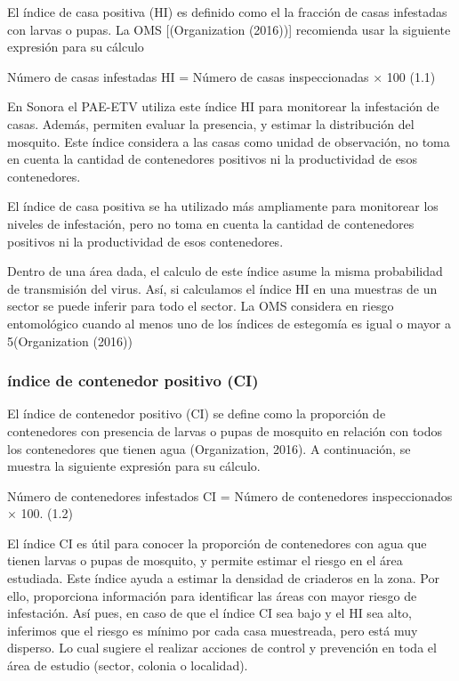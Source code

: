 \documentclass[
  letterpaper,
  twocolumn,
  landscape]{report}
\begin{document}
El índice de casa positiva (HI) es definido como el la fracción de casas
infestadas con larvas o pupas. La OMS {[}(Organization (2016)){]}
recomienda usar la siguiente expresión para su cálculo

Número de casas infestadas HI = Número de casas inspeccionadas × 100
(1.1)

En Sonora el PAE-ETV utiliza este índice HI para monitorear la
infestación de casas. Además, permiten evaluar la presencia, y estimar
la distribución del mosquito. Este índice considera a las casas como
unidad de observación, no toma en cuenta la cantidad de contenedores
positivos ni la productividad de esos contenedores.

El índice de casa positiva se ha utilizado más ampliamente para
monitorear los niveles de infestación, pero no toma en cuenta la
cantidad de contenedores positivos ni la productividad de esos
contenedores.

Dentro de una área dada, el calculo de este índice asume la misma
probabilidad de transmisión del virus. Así, si calculamos el índice HI
en una muestras de un sector se puede inferir para todo el sector. La
OMS considera en riesgo entomológico cuando al menos uno de los índices
de estegomía es igual o mayor a 5(Organization (2016))

\subsubsection{índice de contenedor positivo
(CI)}\label{uxedndice-de-contenedor-positivo-ci}

El índice de contenedor positivo (CI) se define como la proporción de
contenedores con presencia de larvas o pupas de mosquito en relación con
todos los contenedores que tienen agua (Organization, 2016). A
continuación, se muestra la siguiente expresión para su cálculo.

Número de contenedores infestados CI = Número de contenedores
inspeccionados × 100. (1.2)

El índice CI es útil para conocer la proporción de contenedores con agua
que tienen larvas o pupas de mosquito, y permite estimar el riesgo en el
área estudiada. Este índice ayuda a estimar la densidad de criaderos en
la zona. Por ello, proporciona información para identificar las áreas
con mayor riesgo de infestación. Así pues, en caso de que el índice CI
sea bajo y el HI sea alto, inferimos que el riesgo es mínimo por cada
casa muestreada, pero está muy disperso. Lo cual sugiere el realizar
acciones de control y prevención en toda el área de estudio (sector,
colonia o localidad).
\end{document}
